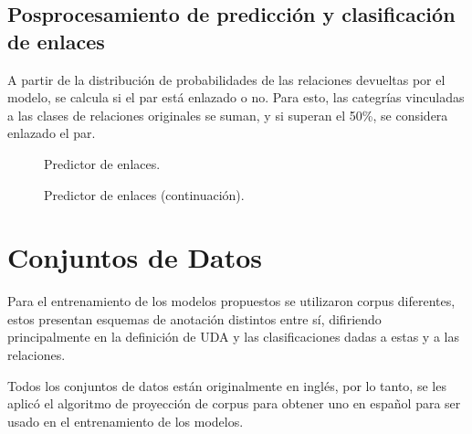 \documentclass[a4paper,11pt,twocolumn,twoside]{article}
\begin{document}
\subsection{Posprocesamiento de predicción y clasificación de enlaces}

A partir de la distribución de probabilidades de las relaciones devueltas por el modelo,
se calcula si el par está enlazado o no. Para esto, las categrías vinculadas a las clases de relaciones 
originales se suman, y si superan el 50\%, se considera enlazado el par.


\begin{figure}[h]
	\centering
	
	\caption{Predictor de enlaces.}
	\label{fig:link_predictor_model1}
\end{figure}
\begin{figure}[h]
	\centering
	
	\caption{Predictor de enlaces (continuación).}
	\label{fig:link_predictor_model2}
\end{figure}

\section{Conjuntos de Datos}

Para el entrenamiento de los modelos propuestos se utilizaron corpus diferentes, estos
presentan esquemas de anotación distintos entre sí, difiriendo principalmente en la definición de UDA y 
las clasificaciones dadas a estas y a las relaciones.

Todos los conjuntos de datos están originalmente en inglés, por lo tanto, se les aplicó el algoritmo de proyección
de corpus para obtener uno en español para ser usado en el entrenamiento de los modelos.
\end{document}
